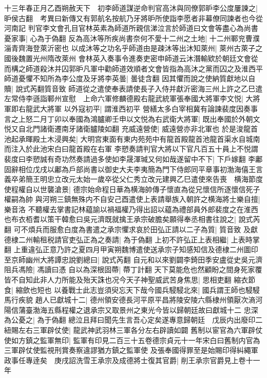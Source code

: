 十三年春正月乙酉朔赦天下　初李師道謀逆命判官高沐與同僚郭昈李公度屢諫之|{
	昈侯古翻　考異曰新傳又有郭航名按航乃牙將昈所使詣李愿者非幕僚同諫者也今從河南記}
判官李文會孔目官林英素為師道所親信涕泣言於師道曰文會等盡心為尚書憂家事|{
	心為于偽翻}
反為高沐等所疾尚書奈何不愛十二州之土地|{
	十二州鄆兖曹濮淄青齊海登萊沂密也}
以成沐等之功名乎師道由是疎沐等出沐知萊州|{
	萊州古萊子之國後魏置光州隋改萊州}
會林英入奏事令進奏吏密申師道云沐潛輸欵於朝廷文會從而構之師道殺沐并囚郭昈凡軍中勸師道效順者文會皆指為高沐之黨而囚之及淮西平師道憂懼不知所為李公度及牙將李英曇|{
	曇徒含翻}
因其懼而說之使納質獻地以自贖|{
	說式芮翻質音致}
師道從之遣使奉表請使長子入侍并獻沂密海三州上許之乙巳遣左常侍李遜詣鄆州宣慰　上命六軍修麟德殿右龍武統軍張奉國大將軍李文悦|{
	大將軍即右龍武大將軍}
以外寇初平|{
	謂淮西初平}
營繕太多白宰相冀有論諫裴度因奏事言之上怒二月丁卯以奉國為鴻臚卿壬申以文悦為右武衛大將軍|{
	既出奉國於外朝文悦又自北門諸衛遷南牙諸衛臚陵如翻}
充威遠營使|{
	威遠營亦非北軍也}
於是浚龍首池起承暉殿土木浸興矣|{
	大明宫東面有東内苑苑中有龍首殿龍首池龍首渠水自城南而注入於此池宋白曰龍首殿在右軍}
李愬奏請判官大將以下官凡百五十員上不悦謂裴度曰李愬誠有奇功然奏請過多使如李晟渾瑊又何如哉遂留中不下|{
	下戶嫁翻}
李鄘固辭相位戊戌以鄘為戶部尚書以御史大夫李夷簡為門下侍郎同平章事初渤海僖王言義卒弟簡王明忠立改元太始一歲卒從父仁秀立改元建興乙巳遣使來告喪　横海節度使程權自以世襲滄景|{
	德宗始命程日華為横海帥傳子懷直為從兄懷信所逐懷信死子權嗣為帥}
與河朔三鎮無殊内不自安己酉遣使上表請舉族入朝許之横海將士樂自擅|{
	樂音洛}
不聽權去掌書記林藴諭以禍福權乃得出詔以藴為禮部員外郎裴度之在淮西也布衣栢耆以策干韓愈曰吳元濟既就擒王承宗破膽矣願得奉丞相書往說之|{
	說式芮翻}
可不煩兵而服愈白度為書遣之承宗懼求哀於田弘正請以二子為質|{
	質音致}
及獻德棣二州輸租税請官吏弘正為之奏請|{
	為于偽翻}
上初不許弘正上表相繼|{
	上表時掌翻}
上重違弘正意乃許之夏四月甲寅朔魏博遣使送承宗子知感知信及德棣二州圖印至京師幽州大將譚忠說劉總曰|{
	說式芮翻}
自元和以來劉闢李錡田季安盧從史吳元濟阻兵馮險|{
	馮讀曰憑}
自以為深根固蔕|{
	蔕丁計翻}
天下莫能危也然顧盼之間身死家覆皆不自知此非人力所能及殆天誅也况今天子神聖威武苦身焦思|{
	思相吏翻}
縮衣節食|{
	縮歛也短也}
以養戰士此志豈須臾忘天下哉今國兵駸駸北來|{
	國兵謂王師也駸駸馬行疾貌}
趙人已獻城十二|{
	德州領安德長河平原平昌將陵安陵六縣棣州領厭次滳河陽信蒲臺渤海五縣程權之退承宗又取景州之東光今皆以歸朝廷故曰獻城十二}
忠深為公憂之|{
	為于偽翻}
總泣且拜曰聞先生言吾心定矣遂專意歸朝廷　戊辰内出廢印二紐賜左右三軍辟仗使|{
	龍武神武羽林三軍各分左右辟讀如闢}
舊制以宦官為六軍辟仗使如方鎮之監軍無印|{
	監軍有印見二百三十五卷德宗貞元十一年宋白曰舊制内官為三軍辟仗使監視刑賞奏察違謬猶方鎮之監軍使}
及張奉國得罪至是始賜印得糾繩軍政事任專逹矣　庚戌詔洗雪王承宗及成德將士復其官爵|{
	削王承宗官爵見上卷十一年}
